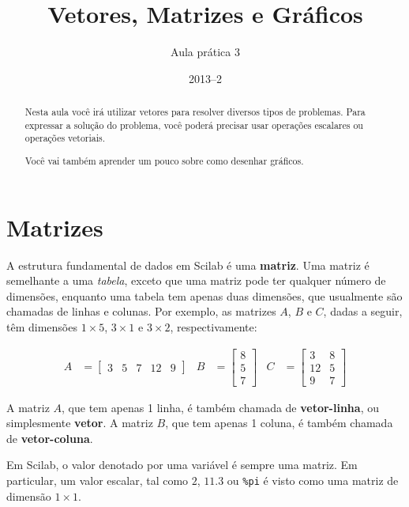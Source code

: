 \documentclass[11pt,fleqn]{practice}
\begin{document}
\subtitle{Aula prática 3}
\title{Vetores, Matrizes e Gráficos}
\author{}
\date{2013--2}
\maketitle

\begin{abstract}
  Nesta aula você irá utilizar vetores para resolver diversos tipos de
  problemas. Para expressar a solução do problema, você poderá precisar
  usar operações escalares ou operações vetoriais.

  Você vai também aprender um pouco sobre como desenhar gráficos.
\end{abstract}

\tableofcontents

\section{Matrizes}

A estrutura fundamental de dados em Scilab é uma \textbf{matriz}. Uma
matriz é semelhante a uma \emph{tabela}, exceto que uma matriz pode ter
qualquer número de dimensões, enquanto uma tabela tem apenas duas
dimensões, que usualmente são chamadas de linhas e colunas. Por exemplo,
as matrizes $A$, $B$ e $C$, dadas a seguir, têm dimensões $1\times 5$,
$3\times 1$ e $3\times 2$, respectivamente:

\begin{align*}
  A &=
  \begin{bmatrix}
    3 & 5 & 7 & 12 & 9
  \end{bmatrix}
  &
  B &=
  \begin{bmatrix}
    8 \\
    5 \\
    7
  \end{bmatrix}
  &
  C &=
  \begin{bmatrix}
    3 & 8 \\
    12 & 5 \\
    9 & 7
  \end{bmatrix}  
\end{align*}

A matriz $A$, que tem apenas 1 linha, é também chamada de
\textbf{vetor-linha}, ou simplesmente \textbf{vetor}.  A matriz $B$, que
tem apenas 1 coluna, é também chamada de \textbf{vetor-coluna}.

Em Scilab, o valor denotado por uma variável é sempre uma matriz. Em
particular, um valor escalar, tal como $2$, $11.3$ ou \texttt{\%pi} é
visto como uma matriz de dimensão $1\times 1$.
\end{document}

